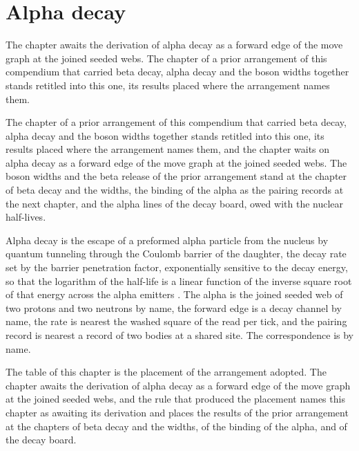 \section{Alpha decay}\label{mod:IX-5-alpha-decay}
\begin{chtable}
The chapter awaits the derivation of alpha decay as a forward edge of the move graph at the joined seeded webs. The chapter of a prior arrangement of this compendium that carried beta decay, alpha decay and the boson widths together stands retitled into this one, its results placed where the arrangement names them.
\end{chtable}
\chdeps{}{}
The chapter of a prior arrangement of this compendium that carried beta decay, alpha decay and the boson widths together stands retitled into this one, its results placed where the arrangement names them, and the chapter waits on alpha decay as a forward edge of the move graph at the joined seeded webs. The boson widths and the beta release of the prior arrangement stand at the chapter of beta decay and the widths, the binding of the alpha as the pairing records at the next chapter, and the alpha lines of the decay board, owed with the nuclear half-lives.
\begin{chbridge}
Alpha decay is the escape of a preformed alpha particle from the nucleus by quantum tunneling through the Coulomb barrier of the daughter, the decay rate set by the barrier penetration factor, exponentially sensitive to the decay energy, so that the logarithm of the half-life is a linear function of the inverse square root of that energy across the alpha emitters \cite{Gamow1928,Gurney1928,Geiger1911}. The alpha is the joined seeded web of two protons and two neutrons by name, the forward edge is a decay channel by name, the rate is nearest the washed square of the read per tick, and the pairing record is nearest a record of two bodies at a shared site. The correspondence is by name.
\end{chbridge}
\begin{chproof}
The table of this chapter is the placement of the arrangement adopted. The chapter awaits the derivation of alpha decay as a forward edge of the move graph at the joined seeded webs, and the rule that produced the placement names this chapter as awaiting its derivation and places the results of the prior arrangement at the chapters of beta decay and the widths, of the binding of the alpha, and of the decay board.
\end{chproof}

